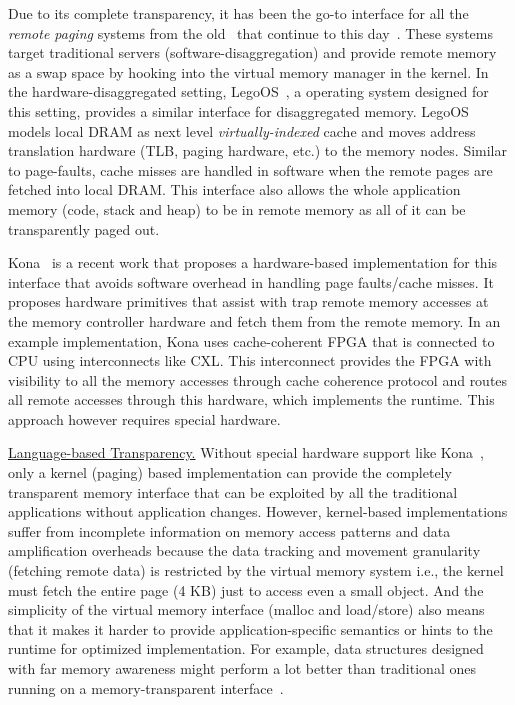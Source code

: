 Due to its complete transparency, it has been the 
go-to interface for all the \textit{remote paging} systems 
from the old~\cite{gms,cashmere} that continue to this
day~\cite{infiniswap,fastswap,zswap,leap}.
These systems target traditional servers 
(software-disaggregation) and provide remote memory as a swap 
space by hooking into the virtual memory manager in the kernel.
In the hardware-disaggregated setting, LegoOS~\cite{legoos}, a 
operating system designed for this setting, provides a similar 
interface for disaggregated memory. LegoOS models local DRAM as
next level \textit{virtually-indexed} cache and moves address 
translation hardware (TLB, paging hardware, etc.) to the memory
nodes. Similar to page-faults, cache misses are handled in 
software when the remote pages are fetched into local DRAM.
This interface also allows the whole application memory 
(code, stack and heap) to be in remote memory as all of it 
can be transparently paged out.

Kona~\cite{kona} is a recent work that proposes a hardware-based 
implementation for this interface that avoids software overhead in
handling page faults/cache misses. It proposes hardware primitives 
that assist with trap remote memory accesses at the memory controller 
hardware and fetch them from the remote memory. In an example 
implementation, Kona uses cache-coherent FPGA that is connected to 
CPU using interconnects like CXL\cite{ccix}. This 
interconnect provides the FPGA with visibility to all the memory 
accesses through cache coherence protocol and routes all remote 
accesses through this hardware, which implements the runtime. 
This approach however requires special hardware.

\vspace{3pt}
\noindent \uline{Language-based Transparency.}
Without special hardware support like Kona~\cite{kona}, 
only a kernel (paging) based implementation can provide 
the completely transparent memory interface that can be 
exploited by all the traditional applications
without application changes. However, kernel-based 
implementations suffer from incomplete information on 
memory access patterns and data amplification overheads 
because the data tracking and movement granularity 
(fetching remote data) is restricted by the virtual memory 
system i.e., the kernel must fetch the entire page (4 KB) 
just to access even a small object. And the simplicity  
of the virtual memory interface 
(malloc and load/store) also means that it makes it 
harder to provide application-specific semantics or 
hints to the runtime for optimized implementation. 
For example, data structures designed with far memory 
awareness might perform a lot better than traditional ones 
running on a memory-transparent interface~\cite{Aguilera2019}. 

